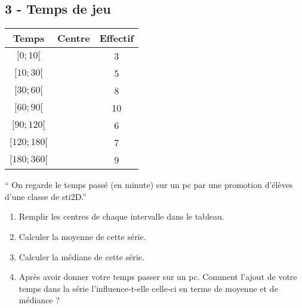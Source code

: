 \documentclass[12pt]{article}
\begin{document}
\begin{multicols}{2}

\subsection*{3 - Temps de jeu}

\begin{center}
  \begin{tabular}{| c | c | c |}
    \hline
    Temps & Centre & Effectif \\
    \hline
    $[ 0 ;  10[$ & \phantom{azertyuiop} & 3 \\ 
        \hline
        $[10 ;  30[$ & \phantom{azertyuiop} & 5 \\ 
            \hline
            $[30 ;  60[$ & \phantom{azertyuiop} & 8 \\ 
                \hline
                $[60 ;  90[$ & \phantom{azertyuiop} & 10 \\ 
                    \hline
                    $[90 ; 120[$ & \phantom{azertyuiop} & 6 \\ 
                        \hline
                        $[120; 180[$ & \phantom{azertyuiop} & 7 \\ 
                            \hline
                            $[180; 360[$ & \phantom{azertyuiop} & 9 \\ 
                                \hline
  \end{tabular}
\end{center}

`` On regarde le temps passé (en minute) sur un pc par une promotion d'élèves d'une classe de sti2D.''


\begin{enumerate}
\item[1.] Remplir les centres de chaque intervalle dans le tableau. 
\item[2.] Calculer la moyenne de cette série.
\item[3.] Calculer la médiane de cette série.
\item[4.] Après avoir donner votre temps passer sur un pc. Comment l'ajout de votre temps dans la série l'influence-t-elle celle-ci en terme de moyenne et de médiance ?
\end{enumerate}

\end{multicols}
\end{document}
